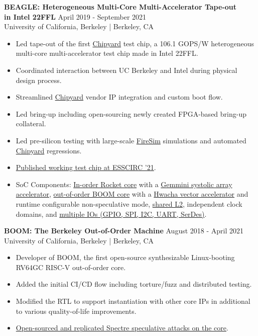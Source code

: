 \documentclass[line]{res}
\begin{document}
\begin{resume}
\label{sec:beagle}
\textbf{BEAGLE: Heterogeneous Multi-Core Multi-Accelerator Tape-out\\in Intel 22FFL} \hfill April 2019 - September 2021
\\
University of California, Berkeley | Berkeley, CA
\\
\vspace{-3mm}
\begin{itemize}
\item Led tape-out of the first \hyperref[sec:chipyard]{Chipyard} test chip, a 106.1 GOPS/W heterogeneous multi-core multi-accelerator test chip made in Intel 22FFL.
\item Coordinated interaction between UC Berkeley and Intel during physical design process.
\item Streamlined \hyperref[sec:chipyard]{Chipyard} vendor IP integration and custom boot flow.
\item Led bring-up including open-sourcing newly created FPGA-based bring-up collateral.
\item Led pre-silicon testing with large-scale \hyperref[sec:firesim]{FireSim} simulations and automated \hyperref[sec:chipyard]{Chipyard} regressions.
\item \hyperref[sec:beaglepaper]{Published working test chip at ESSCIRC '21}.
\item SoC Components: \href{https://www2.eecs.berkeley.edu/Pubs/TechRpts/2016/EECS-2016-17.pdf}{In-order Rocket core} with a \href{https://dl.acm.org/doi/10.1109/DAC18074.2021.9586216}{Gemmini systolic array accelerator}, \hyperref[sec:boom]{out-of-order BOOM core} with a \href{https://people.eecs.berkeley.edu/~krste/papers/EECS-2015-263.pdf}{Hwacha vector accelerator} and runtime configurable non-speculative mode, \href{https://github.com/chipsalliance/rocket-chip-inclusive-cache}{shared L2}, independent clock domains, and \href{https://github.com/chipsalliance/rocket-chip-blocks}{multiple IOs (GPIO, SPI, I2C, UART, SerDes)}.
\end{itemize}

\vspace{-2.4mm}

\label{sec:boom}
\textbf{BOOM: The Berkeley Out-of-Order Machine} \hfill August 2018 - April 2021
\\
University of California, Berkeley | Berkeley, CA
\\
\vspace{-3mm}
\begin{itemize}
\item Developer of BOOM, the first open-source synthesizable Linux-booting RV64GC RISC-V out-of-order core.
\item Added the initial CI/CD flow including torture/fuzz and distributed testing.
\item Modified the RTL to support instantiation with other core IPs in additional to various quality-of-life improvements.
\item \hyperref[sec:spectrerepl]{Open-sourced and replicated Spectre speculative attacks on the core}.
\end{itemize}


\end{resume}
\end{document}
